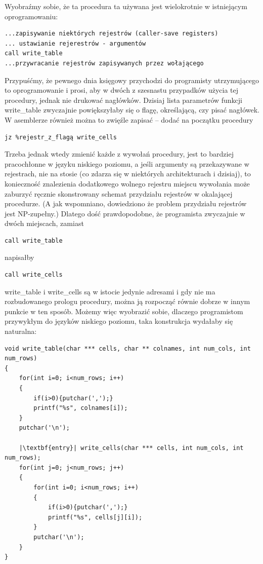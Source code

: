 Wyobraźmy sobie, że ta procedura ta używana jest wielokrotnie w istniejącym oprogramowaniu:
\begin{lstlisting}
...zapisywanie niektórych rejestrów (caller-save registers)
... ustawianie rejerestrów - argumentów
call write_table
...przywracanie rejestrów zapisywanych przez wołającego
\end{lstlisting}
Przypuśćmy, że pewnego dnia księgowy przychodzi do programisty utrzymującego to oprogramowanie i prosi, aby w dwóch z szesnastu przypadków użycia tej procedury, jednak nie drukować nagłówków. Dzisiaj lista parametrów funkcji write\_table zwyczajnie powiększyłaby się o flagę, określającą, czy pisać nagłówek. W asemblerze również można to zwięźle zapisać – dodać na początku procedury
\begin{lstlisting}
jz %rejestr_z_flagą write_cells
\end{lstlisting}
Trzeba jednak wtedy zmienić każde z wywołań procedury, jest to bardziej pracochłonne w języku niskiego poziomu, a jeśli argumenty są przekazywane w rejestrach, nie na stosie (co zdarza się w niektórych architekturach i dzisiaj), to konieczność znalezienia dodatkowego wolnego rejestru miejscu wywołania może zaburzyć ręcznie skonstrowany schemat przydziału rejestrów w okalającej procedurze. (A jak wspomniano, dowiedziono że problem przydziału rejestrów jest NP-zupełny.\cite{REGISTER_ALLOCATION_CHAITIN1981}) Dlatego dość prawdopodobne, że programista zwyczajnie w dwóch miejscach, zamiast
\begin{lstlisting}
call write_table
\end{lstlisting}
napisałby 
\begin{lstlisting}
call write_cells
\end{lstlisting}
write\_table i write\_cells są w istocie jedynie adresami i gdy nie ma rozbudowanego prologu procedury, można ją rozpocząć równie dobrze w innym punkcie w ten sposób. Możemy więc wyobrazić sobie, dlaczego programistom przywykłym do języków niskiego poziomu, taka konstrukcja wydałaby się naturalna:
\lstset{
    escapechar=|,
    breaklines=true
}
\begin{lstlisting}
void write_table(char *** cells, char ** colnames, int num_cols, int num_rows)
{
    for(int i=0; i<num_rows; i++)
    {
        if(i>0){putchar(',');}
        printf("%s", colnames[i]);
    }
    putchar('\n');
    
    |\textbf{entry}| write_cells(char *** cells, int num_cols, int num_rows);
    for(int j=0; j<num_rows; j++)
    {
        for(int i=0; i<num_rows; i++)
        {
            if(i>0){putchar(',');}
            printf("%s", cells[j][i]);
        }
        putchar('\n');
    }
}
\end{lstlisting}

